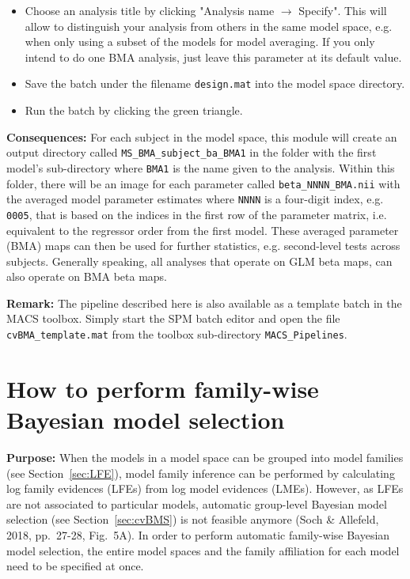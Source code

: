 \documentclass[a4paper,12pt]{article}
\newcommand{\ra}{$\rightarrow$ }
\begin{document}
\begin{itemize}
\pagebreak
\item
Choose an analysis title by clicking "Analysis name \ra Specify". This will allow to distinguish your analysis from others in the same model space, e.g. when only using a subset of the models for model averaging. If you only intend to do one BMA analysis, just leave this parameter at its default value.

\item
Save the batch under the filename \texttt{design.mat} into the model space directory.

\item
Run the batch by clicking the green triangle.
	
\end{itemize}

\textbf{Consequences:} For each subject in the model space, this module will create an output directory called \texttt{MS\_BMA\_subject\_ba\_BMA1} in the folder with the first model's sub-directory where \texttt{BMA1} is the name given to the analysis. Within this folder, there will be an image for each parameter called \texttt{beta\_NNNN\_BMA.nii} with the averaged model parameter estimates where \texttt{NNNN} is a four-digit index, e.g. \texttt{0005}, that is based on the indices in the first row of the parameter matrix, i.e. equivalent to the regressor order from the first model. These averaged parameter (BMA) maps can then be used for further statistics, e.g. second-level tests across subjects. Generally speaking, all analyses that operate on GLM beta maps, can also operate on BMA beta maps.

\textbf{Remark:} The pipeline described here is also available as a template batch in the MACS toolbox. Simply start the SPM batch editor and open the file \texttt{cvBMA\_template.mat} from the toolbox sub-directory \texttt{MACS\_Pipelines}.



\pagebreak
{}
\section[How to perform family-wise Bayesian model selection]{How to perform family-wise \\ Bayesian model selection} \label{sec:cvBMS-fam}

\textbf{Purpose:} When the models in a model space can be grouped into model families (see Section~\ref{sec:LFE}), model family inference can be performed by calculating log family evidences (LFEs) from log model evidences (LMEs). However, as LFEs are not associated to particular models, automatic group-level Bayesian model selection (see Section~\ref{sec:cvBMS}) is not feasible anymore (Soch \& Allefeld, 2018, pp.~27-28, Fig.~5A). In order to perform automatic family-wise Bayesian model selection, the entire model spaces and the family affiliation for each model need to be specified at once.
\end{document}

